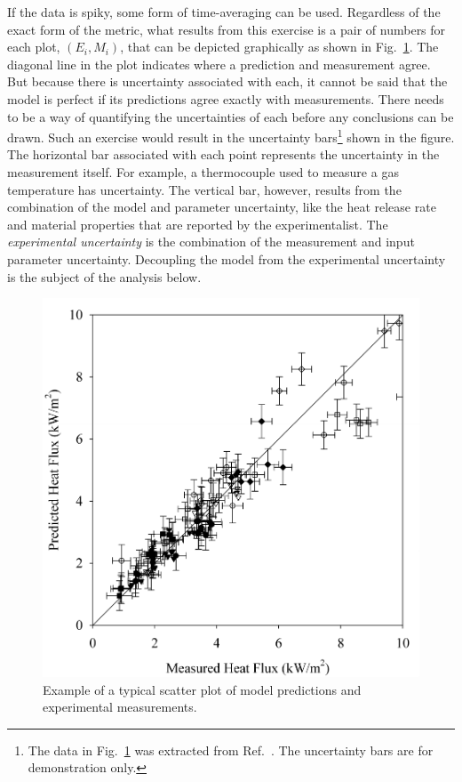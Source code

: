If the data is spiky, some form of time-averaging can be used. Regardless of the exact form of the metric, what results from
this exercise is a pair of numbers for each plot, $(E_i,M_i)$, that can be depicted graphically as shown in Fig.~\ref{scatterplot}.
The diagonal line in the plot indicates where a prediction and measurement agree.
But because there is uncertainty associated with each, it cannot be said that the model is perfect if its predictions
agree exactly with measurements.
There needs to be a way of quantifying the uncertainties of each before any conclusions can be drawn.
Such an exercise would result in the uncertainty
bars\footnote{The data in Fig.~\ref{scatterplot} was extracted from Ref.~\cite{NUREG_1824}.
The uncertainty bars are for demonstration only.}
shown in the figure. The
horizontal bar associated with each point represents the uncertainty in the measurement itself.
For example, a thermocouple used to measure a gas
temperature has uncertainty. The vertical bar, however, results from the combination of the model
and parameter uncertainty, like the heat release rate and material properties that are reported by the experimentalist.
The {\em experimental uncertainty} is the combination of the measurement and input parameter uncertainty.
Decoupling the model from the experimental uncertainty is the subject of the analysis below.

\begin{figure}[t]
\begin{center}
\includegraphics[height=3.in]{FIGURES/scatterplot}
\end{center}
\caption[Sample scatter plot.]{Example of a typical scatter plot of model predictions and experimental measurements.}
\label{scatterplot}
\end{figure}


